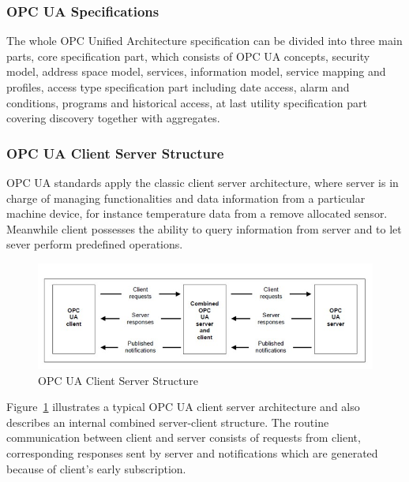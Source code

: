 \documentclass[]{llncs}
\begin{document}
\subsubsection{OPC UA Specifications}

The whole OPC Unified Architecture specification can be divided into three main parts, core specification part, which consists of OPC UA concepts, security model, address space model, services, information model, service mapping and profiles, access type specification part including date access, alarm and conditions, programs and historical access, at last utility specification part covering discovery together with aggregates.

\subsubsection{OPC UA Client Server Structure}
 OPC UA standards apply the classic client server architecture, where server is in charge of managing functionalities and data information from a particular machine device, for instance temperature data from a remove allocated sensor. Meanwhile client possesses the ability to query information from server and to let sever perform predefined operations.

\begin{figure}
	\centering
	\includegraphics[width=1.00\textwidth]{cs.jpg}
		\caption[ ]{OPC UA Client Server Structure\cite{O1}}
	\label{fig:cs}
\end{figure}
Figure~\ref{fig:cs} illustrates a typical OPC UA client server architecture and also describes an internal combined server-client structure. The routine communication between client and server consists of requests from client, corresponding responses sent by server and notifications which are generated because of client's early subscription.
\end{document}

